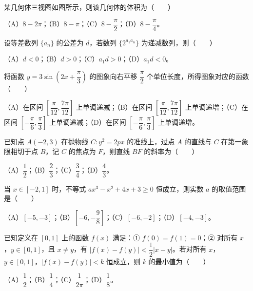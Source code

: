 \begin{question}
某几何体三视图如图所示，则该几何体的体积为\mbox{（　　）}
\nopagebreak[4]
\begin{center}\end{center}
\nopagebreak[4]
（A）$8-2\pi$；（B）$8-\pi$；（C）$8-\dfrac\pi2$；（D）$8-\dfrac\pi4$。

\end{question}
\begin{question}
设等差数列 $\{a_n\}$ 的公差为 $d$，若数列 $\{2^{a_1a_n}\}$ 为递减数列，则\mbox{（　　）}

（A）$d<0$；（B）$d>0$；（C）$a_1d>0$；（D）$a_1d<0$。

\end{question}
\begin{question}
将函数 $y=3\sin\left(2x+\dfrac\pi3\right)$ 的图象向右平移 $\dfrac\pi2$ 个单位长度，所得图象对应的函数\mbox{（　　）}

（A）在区间 $\left[\dfrac\pi{12},\dfrac{7\pi}{12}\right]$ 上单调递减；（B）在区间 $\left[\dfrac\pi{12},\dfrac{7\pi}{12}\right]$ 上单调递增；（C）在区间 $\left[-\dfrac\pi6,\dfrac\pi3\right]$ 上单调递减；（D）在区间 $\left[-\dfrac\pi6,\dfrac\pi3\right]$ 上单调递增。

\end{question}
\begin{question}
已知点 $A(-2,3)$ 在抛物线 $C:y^2=2px$ 的准线上，过点 $A$ 的直线与 $C$ 在第一象限相切于点 $B$，记 $C$ 的焦点为 $F$，则直线 $BF$ 的斜率为\mbox{（　　）}

（A）$\dfrac12$；（B）$\dfrac23$；（C）$\dfrac34$；（D）$\dfrac43$。

\end{question}
\begin{question}
当 $x\in[-2,1]$ 时，不等式 $ax^3-x^2+4x+3\geqslant 0$ 恒成立，则实数 $a$ 的取值范围是\mbox{（　　）}

（A）$[-5,-3]$；（B）$\left[-6,-\dfrac98\right]$；（C）$[-6,-2]$；（D）$[-4,-3]$。

\end{question}
\begin{question}
已知定义在 $[0,1]$ 上的函数 $f(x)$ 满足：① $f(0)=f(1)=0$；② 对所有 $x$，$y\in[0,1]$，且 $x\neq y$，有 $|f(x)-f(y)|<\dfrac12|x-y|$。若对所有 $x$，$y\in[0,1]$，$|f(x)-f(y)|<k$ 恒成立，则 $k$ 的最小值为\mbox{（　　）}

（A）$\dfrac12$；（B）$\dfrac14$；（C）$\dfrac1{2\pi}$；（D）$\dfrac18$。

\end{question}

